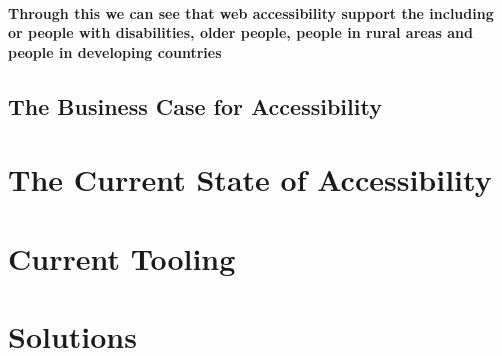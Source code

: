 \documentclass{article}
\begin{document}
\paragraph{Through this we can see that web accessibility support the including or people with disabilities, older people, people in rural areas and people in developing countries}

\subsection{The Business Case for Accessibility}






\section{The Current State of Accessibility}




\section{Current Tooling}


\section{Solutions}
\end{document}
